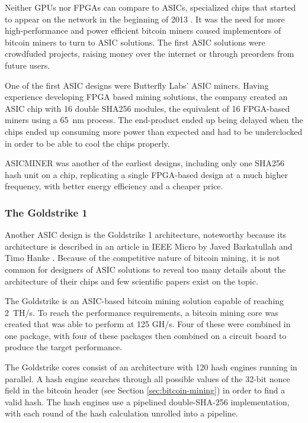 Neither GPUs nor FPGAs can compare to ASICs, specialized chips that started to appear on the network
in the beginning of 2013 \cite{first-asic-miner}. It was the need for more high-performance and power
efficient bitcoin miners caused implementors of bitcoin miners to turn to ASIC solutions. The first
ASIC solutions were crowdfuded projects, raising money over the internet or through preorders from
future users.

One of the first ASIC designs were Butterfly Labs' ASIC miners. Having experience developing
FPGA based mining solutions, the company created an ASIC chip with 16 double SHA256 modules,
the equivalent of 16 FPGA-based miners using a 65~nm process. The end-product ended up being
delayed when the chips ended up consuming more power than expected and had to be underclocked
in order to be able to cool the chips properly.

ASICMINER was another of the earliest designs, including only one SHA256 hash unit on a chip,
replicating a single FPGA-based design at a much higher frequency, with better energy efficiency
and a cheaper price. \cite{bespoke-silicon}

\subsubsection{The Goldstrike 1}
Another ASIC design is the Goldstrike 1 architecture, noteworthy because its architecture is
described in an article in IEEE Micro by Javed Barkatullah and Timo Hanke \cite{goldstrike}.
Because of the competitive nature of bitcoin mining, it is not common for designers of ASIC
solutions to reveal too many details about the architecture of their chips and few scientific
papers exist on the topic.

The Goldstrike is an ASIC-based bitcoin mining solution capable of reaching 2~TH/s. To reach the performance
requirements, a bitcoin mining core was created that was able to perform at 125 GH/s. Four of
these were combined in one package, with four of these packages then combined on a circuit board
to produce the target performance.

The Goldstrike cores consist of an architecture with 120 hash engines running in parallel.
A hash engine searches through all possible values of the 32-bit nonce field in the bitcoin header
(see Section \ref{sec:bitcoin-mining}) in order to find a valid hash.
The hash engines use a pipelined double-SHA-256 implementation, with each round of the hash calculation
unrolled into a pipeline.

